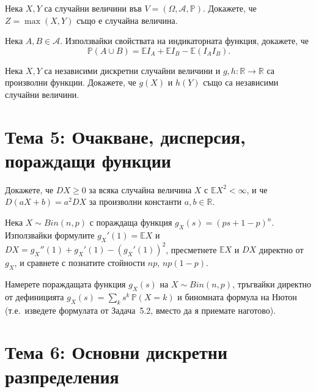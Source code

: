 \begin{probbox}[Задача 4.1]
Нека $X,Y$ са случайни величини във $V=(\Omega,\mathcal A,\mathbb
P)$. Докажете, че $Z=\max(X,Y)$ също е случайна величина.
\end{probbox}

\begin{probbox}[Задача 4.2]
Нека $A,B\in\mathcal A$. Използвайки свойствата на индикаторната
функция, докажете, че
\[
  \mathbb P(A\cup B) = \mathbb E I_A + \mathbb E I_B - \mathbb E(I_A I_B).
\]
\end{probbox}

\begin{probbox}[Задача 4.3]
Нека $X,Y$ са независими дискретни случайни величини и $g,h:\mathbb
R\to\mathbb R$ са произволни функции. Докажете, че $g(X)$ и $h(Y)$
също са независими случайни величини.
\end{probbox}

\section*{Тема 5: Очакване, дисперсия, пораждащи функции}

\begin{probbox}[Задача 5.1]
Докажете, че $DX\ge0$ за всяка случайна величина $X$ с $\mathbb
EX^2<\infty$, и че $D(aX+b)=a^2DX$ за произволни константи
$a,b\in\mathbb R$.
\end{probbox}

\begin{probbox}[Задача 5.2]
Нека $X\sim Bin(n,p)$ с пораждаща функция $g_X(s)=(ps+1-p)^n$.
Използвайки формулите $g_X'(1)=\mathbb EX$ и $DX=g_X''(1)+g_X'(1)-
(g_X'(1))^2$, пресметнете $\mathbb EX$ и $DX$ директно от $g_X$, и
сравнете с познатите стойности $np$, $np(1-p)$.
\end{probbox}

\begin{probbox}[Задача 5.3]
Намерете пораждащата функция $g_X(s)$ на $X\sim Bin(n,p)$, тръгвайки
директно от дефиницията $g_X(s)=\sum_k s^k\,\mathbb P(X=k)$ и
биномната формула на Нютон (т.е.\ изведете формулата от Задача~5.2,
вместо да я приемате наготово).
\end{probbox}

\section*{Тема 6: Основни дискретни разпределения}

